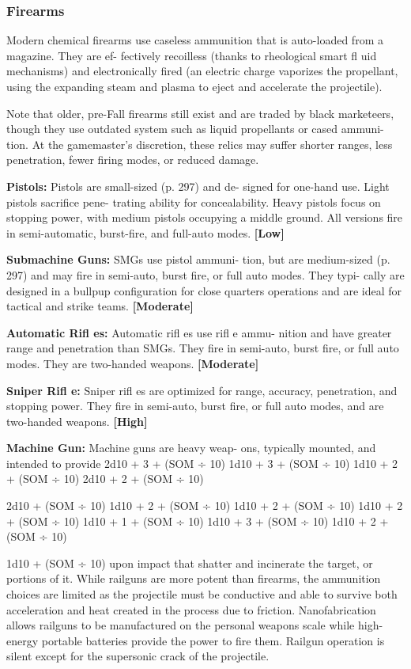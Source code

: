 \subsubsection{Firearms}

Modern chemical firearms use caseless ammunition 
that is auto-loaded from a magazine. They are ef-
fectively recoilless (thanks to rheological smart fl uid 
mechanisms) and electronically fired (an electric 
charge vaporizes the propellant, using the expanding 
steam and plasma to eject and accelerate the projectile).

Note that older, pre-Fall firearms still exist and are 
traded by black marketeers, though they use outdated 
system such as liquid propellants or cased ammuni-
tion. At the gamemaster's discretion, these relics may 
suffer shorter ranges, less penetration, fewer firing 
modes, or reduced damage.

\textbf{Pistols:} Pistols are small-sized (p. 297) and de-
signed for one-hand use. Light pistols sacrifice pene-
trating ability for concealability. Heavy pistols focus 
on stopping power, with medium pistols occupying 
a middle ground. All versions fire in semi-automatic, 
burst-fire, and full-auto modes. \textbf{[Low]}

\textbf{Submachine Guns:} SMGs use pistol ammuni-
tion, but are medium-sized (p. 297) and may fire in 
semi-auto, burst fire, or full auto modes. They typi-
cally are designed in a bullpup configuration for 
close quarters operations and are ideal for tactical 
and strike teams. \textbf{[Moderate]}

\textbf{Automatic Rifl es:} Automatic rifl es use rifl e ammu-
nition and have greater range and penetration than 
SMGs. They fire in semi-auto, burst fire, or full auto 
modes. They are two-handed weapons. \textbf{[Moderate]}

\textbf{Sniper Rifl e:} Sniper rifl es are optimized for range, 
accuracy, penetration, and stopping power. They fire 
in semi-auto, burst fire, or full auto modes, and are 
two-handed weapons. \textbf{[High]}

\textbf{Machine Gun:} Machine guns are heavy weap-
ons, typically mounted, and intended to provide 
2d10 + 3 + (SOM ÷ 10) 
1d10 + 3 + (SOM ÷ 10) 
1d10 + 2 + (SOM ÷ 10) 
2d10 + 2 + (SOM ÷ 10)

2d10 + (SOM ÷ 10) 
1d10 + 2 + (SOM ÷ 10) 
1d10 + 2 + (SOM ÷ 10) 
1d10 + 2 + (SOM ÷ 10) 
1d10 + 1 + (SOM ÷ 10) 
1d10 + 3 + (SOM ÷ 10) 
1d10 + 2 + (SOM ÷ 10) 

1d10 + (SOM ÷ 10)
upon impact that shatter and incinerate the target, or 
portions of it. While railguns are more potent than 
firearms, the ammunition choices are limited as the 
projectile must be conductive and able to survive 
both acceleration and heat created in the process due 
to friction. Nanofabrication allows railguns to be 
manufactured on the personal weapons scale while 
high-energy portable batteries provide the power to 
fire them. Railgun operation is silent except for the 
supersonic crack of the projectile.

